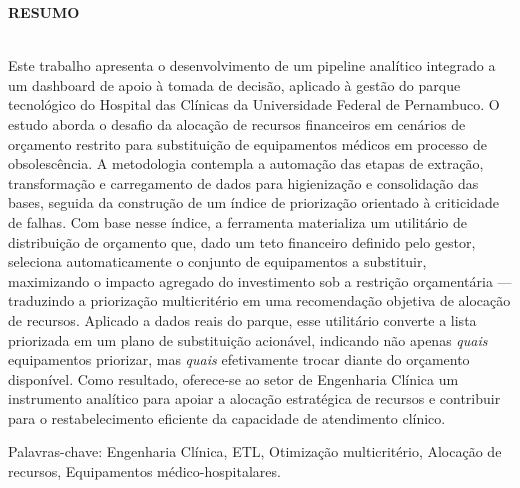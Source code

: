 \begin{center}
\textbf{RESUMO}
\end{center}

$\!$\\
\noindent
Este trabalho apresenta o desenvolvimento de um pipeline analítico integrado a um dashboard de apoio à tomada de decisão, aplicado à gestão do parque tecnológico do Hospital das Clínicas da Universidade Federal de Pernambuco. O estudo aborda o desafio da alocação de recursos financeiros em cenários de orçamento restrito para substituição de equipamentos médicos em processo de obsolescência. A metodologia contempla a automação das etapas de extração, transformação e carregamento de dados para higienização e consolidação das bases, seguida da construção de um índice de priorização orientado à criticidade de falhas. Com base nesse índice, a ferramenta materializa um utilitário de distribuição de orçamento que, dado um teto financeiro definido pelo gestor, seleciona automaticamente o conjunto de equipamentos a substituir, maximizando o impacto agregado do investimento sob a restrição orçamentária --- traduzindo a priorização multicritério em uma recomendação objetiva de alocação de recursos. Aplicado a dados reais do parque, esse utilitário converte a lista priorizada em um plano de substituição acionável, indicando não apenas \textit{quais} equipamentos priorizar, mas \textit{quais} efetivamente trocar diante do orçamento disponível. Como resultado, oferece-se ao setor de Engenharia Clínica um instrumento analítico para apoiar a alocação estratégica de recursos e contribuir para o restabelecimento eficiente da capacidade de atendimento clínico.

\vspace{1cm}

\hspace{-1.3cm}Palavras-chave: Engenharia Clínica, ETL, Otimização multicritério, Alocação de recursos, Equipamentos médico-hospitalares.